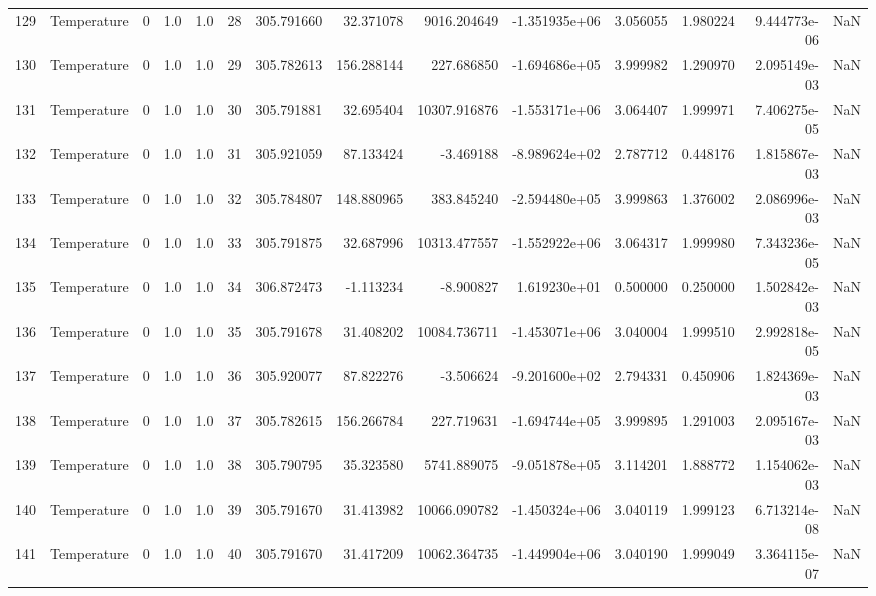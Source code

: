\begin{tabular}{llrrrrrrrrrrrr}
129 &  Temperature &       0 &  1.0 &  1.0 &   28 &  305.791660 &    32.371078 &    9016.204649 & -1.351935e+06 &  3.056055 &  1.980224 &  9.444773e-06 &      NaN \\
130 &  Temperature &       0 &  1.0 &  1.0 &   29 &  305.782613 &   156.288144 &     227.686850 & -1.694686e+05 &  3.999982 &  1.290970 &  2.095149e-03 &      NaN \\
131 &  Temperature &       0 &  1.0 &  1.0 &   30 &  305.791881 &    32.695404 &   10307.916876 & -1.553171e+06 &  3.064407 &  1.999971 &  7.406275e-05 &      NaN \\
132 &  Temperature &       0 &  1.0 &  1.0 &   31 &  305.921059 &    87.133424 &      -3.469188 & -8.989624e+02 &  2.787712 &  0.448176 &  1.815867e-03 &      NaN \\
133 &  Temperature &       0 &  1.0 &  1.0 &   32 &  305.784807 &   148.880965 &     383.845240 & -2.594480e+05 &  3.999863 &  1.376002 &  2.086996e-03 &      NaN \\
134 &  Temperature &       0 &  1.0 &  1.0 &   33 &  305.791875 &    32.687996 &   10313.477557 & -1.552922e+06 &  3.064317 &  1.999980 &  7.343236e-05 &      NaN \\
135 &  Temperature &       0 &  1.0 &  1.0 &   34 &  306.872473 &    -1.113234 &      -8.900827 &  1.619230e+01 &  0.500000 &  0.250000 &  1.502842e-03 &      NaN \\
136 &  Temperature &       0 &  1.0 &  1.0 &   35 &  305.791678 &    31.408202 &   10084.736711 & -1.453071e+06 &  3.040004 &  1.999510 &  2.992818e-05 &      NaN \\
137 &  Temperature &       0 &  1.0 &  1.0 &   36 &  305.920077 &    87.822276 &      -3.506624 & -9.201600e+02 &  2.794331 &  0.450906 &  1.824369e-03 &      NaN \\
138 &  Temperature &       0 &  1.0 &  1.0 &   37 &  305.782615 &   156.266784 &     227.719631 & -1.694744e+05 &  3.999895 &  1.291003 &  2.095167e-03 &      NaN \\
139 &  Temperature &       0 &  1.0 &  1.0 &   38 &  305.790795 &    35.323580 &    5741.889075 & -9.051878e+05 &  3.114201 &  1.888772 &  1.154062e-03 &      NaN \\
140 &  Temperature &       0 &  1.0 &  1.0 &   39 &  305.791670 &    31.413982 &   10066.090782 & -1.450324e+06 &  3.040119 &  1.999123 &  6.713214e-08 &      NaN \\
141 &  Temperature &       0 &  1.0 &  1.0 &   40 &  305.791670 &    31.417209 &   10062.364735 & -1.449904e+06 &  3.040190 &  1.999049 &  3.364115e-07 &      NaN \\

\end{tabular}
